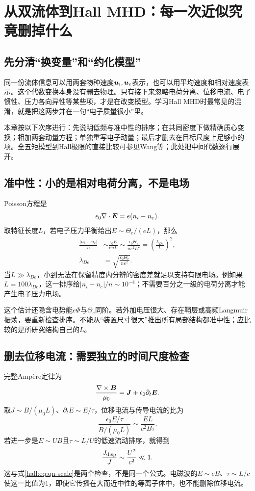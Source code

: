 \chapter{从双流体到Hall MHD：每一次近似究竟删掉什么}
\label{hall:ch:reduction}
\section{先分清“换变量”和“约化模型”}
同一份流体信息可以用两套物种速度$\bm{u}_i,\bm{u}_e$表示，也可以用平均速度和相对速度表示。这个代数变换本身没有删去物理。只有接下来忽略电荷分离、位移电流、电子惯性、压力各向异性等某些项，才是在改变模型。学习Hall MHD时最常见的混淆，就是把这两步并在一句“电子质量很小”里。

本章按以下次序进行：先说明低频与准中性的排序；在共同密度下做精确质心变换；相加两套动量方程；单独重写电子动量；最后才删去在目标尺度上足够小的项。全五矩模型到Hall极限的直接比较可参见Wang等；此处把中间代数逐行展开。\citep{Wang2015}

\section{准中性：小的是相对电荷分离，不是电场}
Poisson方程是
\begin{equation}
\epsilon_0\nabla\cdot\bm{E}=e(n_i-n_e).
\end{equation}
取特征长度$L$，若电子压力平衡给出$E\sim\Theta_e/(eL)$，那么
\begin{align}
\frac{|n_i-n_e|}{n}
&\sim\frac{\epsilon_0 E}{enL}
\sim\frac{\epsilon_0\Theta_e}{ne^2L^2}
=\left(\frac{\lambda_{De}}{L}\right)^2,\\
\lambda_{De}&=\sqrt{\frac{\epsilon_0\Theta_e}{ne^2}}.
\label{hall:eq:qn-scale}
\end{align}
当$L\gg\lambda_{De}$，小到无法在保留精度内分辨的密度差就足以支持有限电场。例如果$L=100\lambda_{De}$，这一排序给$|n_i-n_e|/n\sim10^{-4}$；不需要百分之一级的电荷分离才能产生电子压力电场。

这个估计还隐含电势能$e\Phi$与$\Theta_e$同阶。若外加电压很大、存在鞘层或高频Langmuir振荡，要重新检查排序。不能从“装置尺寸很大”推出所有局部结构都准中性；应比较的是所研究结构自己的$L$。

\section{删去位移电流：需要独立的时间尺度检查}
完整Ampère定律为
\begin{equation}
\frac{\nabla\times\bm{B}}{\mu_0}=\bm{J}+\epsilon_0\partial_t\bm{E}.
\end{equation}
取$J\sim B/(\mu_0L)$、$\partial_tE\sim E/\tau$，位移电流与传导电流的比为
\begin{equation}
\frac{\epsilon_0 E/\tau}{B/(\mu_0L)}
\sim\frac{EL}{c^2B\tau}.
\end{equation}
若进一步是$E\sim UB$且$\tau\sim L/U$的低速流动排序，就得到
\begin{equation}
\frac{J_{\rm disp}}{J}\sim\frac{U^2}{c^2}\ll1.
\label{hall:eq:displacement-order}
\end{equation}
这与式\eqref{hall:eq:qn-scale}是两个检查，不是同一个公式。电磁波的$E\sim cB$、$\tau\sim L/c$使这一比值为1，即使它传播在大而近中性的等离子体中，也不能删除位移电流。

